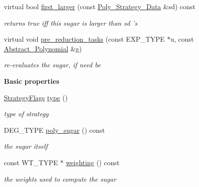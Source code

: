 \begin{DoxyCompactItemize}
\mbox{\label{class_poly___w_sugar___data_a83a899b8195beed8d72d692fe4c228a3}} 
virtual bool \hyperlink{class_poly___w_sugar___data_a83a899b8195beed8d72d692fe4c228a3}{first\+\_\+larger} (const \hyperlink{class_poly___strategy___data}{Poly\+\_\+\+Strategy\+\_\+\+Data} \&sd) const
\begin{DoxyCompactList}\small\item\em returns {\ttfamily true} iff {\ttfamily this} sugar is larger than {\ttfamily sd} 's \end{DoxyCompactList}\item 
\mbox{\label{class_poly___w_sugar___data_a4a34039eb50a2294d2aaf6245c1833b8}} 
virtual void \hyperlink{class_poly___w_sugar___data_a4a34039eb50a2294d2aaf6245c1833b8}{pre\+\_\+reduction\+\_\+tasks} (const E\+X\+P\+\_\+\+T\+Y\+PE $\ast$u, const \hyperlink{class_abstract___polynomial}{Abstract\+\_\+\+Polynomial} \&g)
\begin{DoxyCompactList}\small\item\em re-\/evaluates the sugar, if need be \end{DoxyCompactList}\end{DoxyCompactItemize}
\begin{Indent}\textbf{ Basic properties}\par
\begin{DoxyCompactItemize}
\item 
\mbox{\label{class_poly___w_sugar___data_a472c39541209b6738cb497ebc3c9e205}} 
\hyperlink{group__strategygroup_ga0ee6c8e033547330e6b89929730007f4}{Strategy\+Flags} \hyperlink{class_poly___w_sugar___data_a472c39541209b6738cb497ebc3c9e205}{type} ()
\begin{DoxyCompactList}\small\item\em type of strategy \end{DoxyCompactList}\item 
\mbox{\label{class_poly___w_sugar___data_a2d369a1ab46cf990413f190f22203a3d}} 
D\+E\+G\+\_\+\+T\+Y\+PE \hyperlink{class_poly___w_sugar___data_a2d369a1ab46cf990413f190f22203a3d}{poly\+\_\+sugar} () const
\begin{DoxyCompactList}\small\item\em the sugar itself \end{DoxyCompactList}\item 
\mbox{\label{class_poly___w_sugar___data_a0ac423ed3a00a9b7e71dc8103116c82c}} 
const W\+T\+\_\+\+T\+Y\+PE $\ast$ \hyperlink{class_poly___w_sugar___data_a0ac423ed3a00a9b7e71dc8103116c82c}{weighting} () const
\begin{DoxyCompactList}\small\item\em the weights used to compute the sugar \end{DoxyCompactList}\end{DoxyCompactItemize}
\end{Indent}
